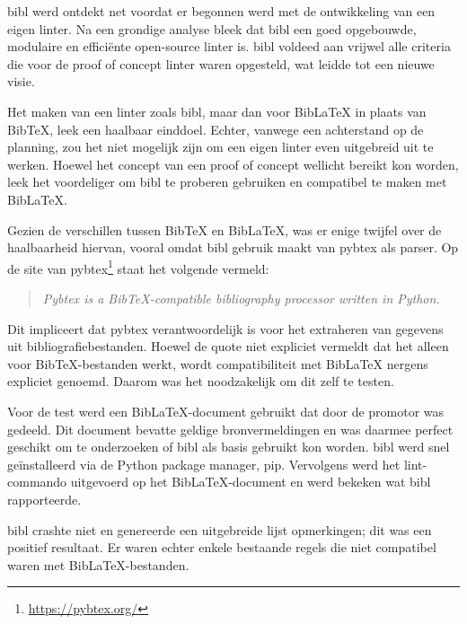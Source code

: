bibl werd ontdekt net voordat er begonnen werd met de ontwikkeling van een eigen linter. Na een grondige analyse bleek dat bibl een goed opgebouwde, modulaire en efficiënte open-source linter is. bibl voldeed aan vrijwel alle criteria die voor de proof of concept linter waren opgesteld, wat leidde tot een nieuwe visie.

Het maken van een linter zoals bibl, maar dan voor BibLaTeX in plaats van BibTeX, leek een haalbaar einddoel. Echter, vanwege een achterstand op de planning, zou het niet mogelijk zijn om een eigen linter even uitgebreid uit te werken. Hoewel het concept van een proof of concept wellicht bereikt kon worden, leek het voordeliger om bibl te proberen gebruiken en compatibel te maken met BibLaTeX.

Gezien de verschillen tussen BibTeX en BibLaTeX, was er enige twijfel over de haalbaarheid hiervan, vooral omdat bibl gebruik maakt van pybtex als parser. Op de site van pybtex\footnote{\url{https://pybtex.org/}} staat het volgende vermeld:

\begin{quote}\emph{Pybtex is a BibTeX-compatible bibliography processor written in Python.}\end{quote}

Dit impliceert dat pybtex verantwoordelijk is voor het extraheren van gegevens uit bibliografiebestanden. Hoewel de quote niet expliciet vermeldt dat het alleen voor BibTeX-bestanden werkt, wordt compatibiliteit met BibLaTeX nergens expliciet genoemd. Daarom was het noodzakelijk om dit zelf te testen.

Voor de test werd een BibLaTeX-document gebruikt dat door de promotor was gedeeld. Dit document bevatte geldige bronvermeldingen en was daarmee perfect geschikt om te onderzoeken of bibl als basis gebruikt kon worden. bibl werd snel geïnstalleerd via de Python package manager, pip. Vervolgens werd het lint-commando uitgevoerd op het BibLaTeX-document en werd bekeken wat bibl rapporteerde.

bibl crashte niet en genereerde een uitgebreide lijst opmerkingen; dit was een positief resultaat. Er waren echter enkele bestaande regels die niet compatibel waren met BibLaTeX-bestanden.

